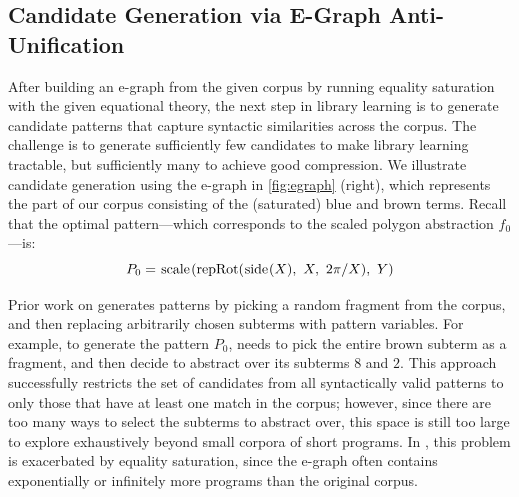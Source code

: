 \subsection{Candidate Generation via E-Graph Anti-Unification}

After building an e-graph from the given corpus by
  running equality saturation with the given equational theory,
  the next step in library learning is
  to generate candidate patterns
  that capture syntactic similarities across the corpus.
%
The challenge is to generate
  sufficiently few candidates
  to make library learning tractable,
  but sufficiently many to achieve good compression.
We illustrate candidate generation
  using the e-graph in \autoref{fig:egraph} (right),
  which represents the part of our corpus
  consisting of the (saturated) blue and brown terms.
Recall that the optimal
  pattern---which corresponds to the scaled polygon abstraction $f_0$---is:
\begin{equation}
  P_0 = \scale{\repRot{\pSide{X}}{X}{2\pi/X}}{Y}\label{eq:p0}
\end{equation}

Prior work on \dc generates patterns by
  picking a random fragment from the corpus,
  and then replacing arbitrarily chosen subterms
  with pattern variables.
For example, to generate the pattern $P_0$,
  \dc needs to pick the entire brown subterm as a fragment,
  and then decide to abstract over its subterms $8$ and $2$.
This approach successfully restricts
  the set of candidates from
  all syntactically valid patterns
  to only those that have
  at least one match in the corpus;
  however, since there are too many ways
  to select the subterms to abstract over,
  this space is still too large to explore exhaustively
  beyond small corpora of short programs.
In \tool, this problem
  is exacerbated by equality saturation,
  since the e-graph often contains exponentially or
  infinitely more programs than the original corpus.

